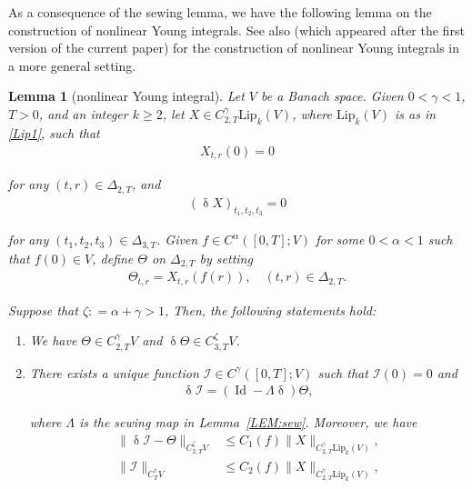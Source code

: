 \documentclass[letterpaper, 11pt,  reqno]{amsart}
\newtheorem{lemma}[theorem]{Lemma}
\DeclareMathOperator{\Id}{Id}
\newcommand{\1}{\hspace{0.5mm}\text{I}\hspace{0.5mm}}
\newcommand{\I}{\mathcal{I}}
\newcommand{\noi}{\noindent}
\newcommand{\al}{\alpha}
\newcommand{\updl}{\updelta}
\newcommand{\Dl}{\Delta}
\newcommand{\g}{\gamma}
\newcommand{\Lip}{\mathrm{Lip}}
\newcommand{\z}{\zeta}
\numberwithin{equation}{section}
\numberwithin{theorem}{section}
\begin{document}
As a consequence of the sewing lemma, 
we have the following lemma
on the construction of nonlinear Young integrals.
See also 
 \cite{HK, G23} (which appeared after the first version of the current paper)
 for the construction of  nonlinear Young integrals
 in a more general setting.


\begin{lemma}[nonlinear Young integral]
\label{LEM:int1}
Let $V$ be a Banach space.
Given $0 < \g < 1$, 
 $T>0$, and an integer $k\ge 2$,  
let $X\in C^\g_{2,T}\Lip_k(V)$, where $\Lip_k(V)$ is as in \eqref{Lip1}, such that 
\begin{align}
X_{t,r}(0)=0
\label{Ja0}
\end{align} 

\noi
for any $(t,r) \in  \Dl_{2,T}$, 
and 
\begin{align}
\label{Ja1}
(\updl X)_{t_1,t_2,t_3} = 0
\end{align}


\noi
for any $(t_1,t_2,t_3)\in \Dl_{3,T}$.
Given 
  $f\in C^{\al}([0,T];V)$ for some $0 < \al < 1$
  such that $f(0) \in V$, 
define  $\Theta$ on $\Dl_{2,T}$
by setting
\begin{align}
\Theta_{t,r} = X_{t,r}(f(r)), \quad (t,r)\in \Dl_{2,T}.
\label{Ja1a}
\end{align}



\noi
Suppose that 
 $\z : = \al + \g > 1$, 
Then,  the following statements hold\textup{:}

\smallskip

\begin{enumerate}


\item[(i)] 
We have $\Theta\in C^\g_{2,T}V$
and
$\updl \Theta \in C^\z_{3,T}V$.




\smallskip

\item[(ii)]
There exists 
a unique function 
$\I\in C^\g([0,T]; V)$
such that $\I(0) =0$ and
\begin{align}
\updl \I = (\Id - \Lambda \updl)\Theta, 
\label{Ja1b}
\end{align}

\noi
where $\Lambda$ is the sewing map in Lemma~\ref{LEM:sew}. 
Moreover,
we have 
\begin{align}
\|\updl \I - \Theta\|_{C^\z_{2,T}  V}
& \leq 
C_1(f)
\|X\|_{C^\g_{2,T}\Lip_k(V)},
\label{Ja2}
\\
\|\I\|_{C^\g_T  V} 
& \leq
C_2(f)
\|X\|_{C^\g_{2,T}\Lip_k(V)}, 
\label{Ja3}
\end{align}



\end{enumerate}
\end{lemma}
\end{document}
